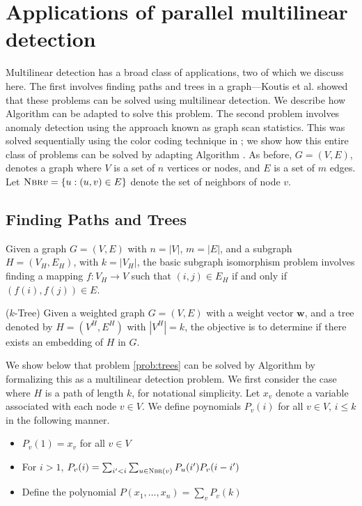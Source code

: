 \section{Applications of parallel multilinear detection}
\label{sec:applications}

Multilinear detection has a broad class of applications, two of which we discuss here.
The first involves finding paths and trees in a graph---Koutis et al.
\cite{DBLP:journals/talg/KoutisW16} showed that these problems can be solved using
multilinear detection. We describe how Algorithm \parmaxwt{} can be adapted
to solve this problem. The second problem involves anomaly detection using the
approach known as graph scan statistics. This was solved sequentially using 
the color coding technique in \cite{cadena:sdm17}; we show how this entire class
of problems can be solved by adapting Algorithm \parmaxwt{}.
As before, $G = (V, E)$, denotes a graph where $V$ is a set of $n$ vertices or nodes, and 
$E$ is a set of $m$ edges. Let $\textsc{Nbr}{v}=\{u: (u,v)\in E\}$ denote the set of neighbors
of node $v$.

\subsection{Finding Paths and Trees}
\label{sec:apps-trees}

Given a graph $G=(V, E)$ with $n=|V|$, $m=|E|$, and a subgraph $H=(V_H, E_H)$, with $k=|V_H|$,
the basic subgraph isomorphism problem involves finding a mapping $f:V_H\rightarrow V$
such that $(i, j)\in E_H$ if and only if $(f(i), f(j))\in E$. 

\begin{problem} ($k$-Tree)
\label{prob:trees}
Given a weighted graph $G=(V, E)$ with a weight vector $\mathbf{w}$, and a tree
denoted by $H=(V^H, E^H)$ with $|V^H|=k$, the objective is to determine if there exists
an embedding of $H$ in $G$.
\end{problem}

We show below that problem \ref{prob:trees} can be solved by Algorithm \parmaxwt{} 
by formalizing this as a multilinear detection problem. We first consider the case
where $H$ is a path of length $k$, for notational simplicity.
Let $x_v$ denote a variable associated with each node $v\in V$.
We define poynomials $P_v(i)$ for all $v\in V$, $i\leq k$ in the following manner.

\begin{itemize}
\item
$P_v(1) = x_v$ for all $v\in V$
\item
For $i>1$,
$P_v(i) = \sum_{i'<i} \sum_{u\in\textsc{Nbr}(v)} P_u(i')P_v(i-i')$
\item
Define the polynomial $P(x_1,\ldots,x_n) = \sum_v P_v(k)$
\end{itemize}

